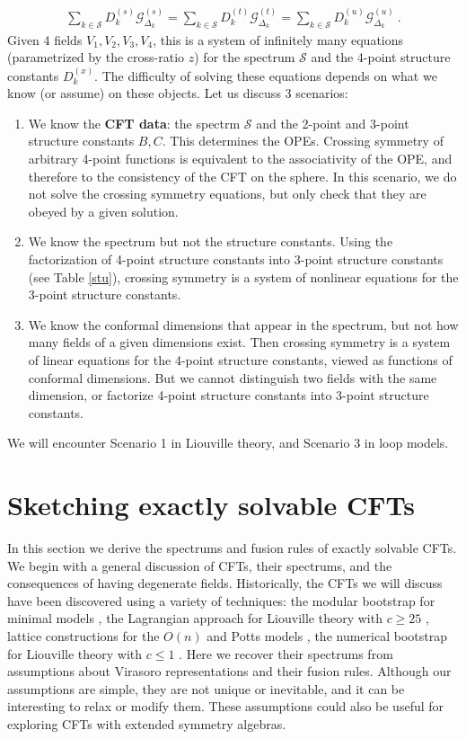 \documentclass[12pt, a4paper]{article}
\theoremstyle{break}
\begin{document}
\begin{align}
 \boxed{\sum_{k\in\mathcal{S}} D_k^{(s)} \mathcal{G}^{(s)}_{\Delta_k} = \sum_{k\in\mathcal{S}} D_k^{(t)} \mathcal{G}^{(t)}_{\Delta_k} = \sum_{k\in\mathcal{S}} D_k^{(u)} \mathcal{G}^{(u)}_{\Delta_k}} \ . 
\end{align}
Given 4 fields $V_1,V_2,V_3,V_4$, this is a system of infinitely many equations (parametrized by the cross-ratio $z$) for the spectrum $\mathcal{S}$ and the 4-point structure constants $D_k^{(x)}$. The difficulty of solving these equations depends on what we know (or assume) on these objects. Let us discuss 3 scenarios:
\begin{enumerate}
 \item We know the \textbf{CFT data}: the spectrm $\mathcal{S}$ and the 2-point and 3-point structure constants $B,C$. This determines the OPEs. Crossing symmetry of arbitrary 4-point functions is equivalent to the associativity of the OPE, and therefore to the consistency of the CFT on the sphere. In this scenario, we do not solve the crossing symmetry equations, but only check that they are obeyed by a given solution.
 \item We know the spectrum but not the structure constants. Using the factorization of 4-point structure constants into 3-point structure constants (see Table \eqref{stu}), crossing symmetry is a system of nonlinear equations for the 3-point structure constants.
 \item We know the conformal dimensions that appear in the spectrum, but not how many fields of a given dimensions exist. Then crossing symmetry is a system of linear equations for the 4-point structure constants, viewed as functions of conformal dimensions. But we cannot distinguish two fields with the same dimension, or factorize 4-point structure constants into 3-point structure constants. 
\end{enumerate}
We will encounter Scenario 1 in Liouville theory, and Scenario 3 in loop models.


\section{Sketching exactly solvable CFTs}\label{sec:sesc}

In this section we derive the spectrums and fusion rules of exactly solvable CFTs. We begin with a general discussion of CFTs, their spectrums, and the consequences of having degenerate fields. Historically, the CFTs we will discuss have been discovered using a variety of techniques: the modular bootstrap for minimal models \cite{fms97}, the Lagrangian approach for Liouville theory with $c\geq 25$ \cite{zz95}, lattice constructions for the $O(n)$ and Potts models \cite{fsz87}, the numerical bootstrap for Liouville theory with $c\leq 1$ \cite{rs15}. Here we recover their spectrums from assumptions about Virasoro representations and their fusion rules. Although our assumptions are simple, they are not unique or inevitable, and it can be interesting to relax or modify them. These assumptions could also be useful for exploring CFTs with extended symmetry algebras. 
\end{document}
